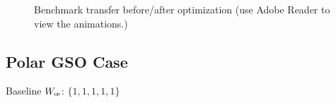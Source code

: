 \begin{figure}[H]
  \begin{animateinline}[controls,width=\linewidth, loop]{10}
  \end{animateinline}
  \caption{Benchmark transfer before/after optimization (use Adobe Reader to view the animations.)}
  \label{fig:benchmark_optim_anim}
\end{figure}

\newpage
\subsection{Polar GSO Case}
\label{sec:gso_case_plot}
Baseline \(W_{\moe}\): \(\{1, 1, 1, 1, 1\}\)
